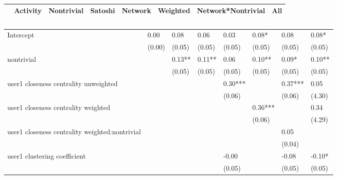 \begin{table}
\caption{}
\begin{center}
\begin{tabular}{lccccccc}
\hline
                                               & Activity & Nontrivial & Satoshi &   Network   & Weighted & Network*Nontrivial &  All    \\
\hline
\hline
\end{tabular}
\begin{tabular}{llllllll}
Intercept                                      & 0.00     & 0.08       & 0.06    & 0.03        & 0.08*    & 0.08               & 0.08*   \\
                                               & (0.00)   & (0.05)     & (0.05)  & (0.05)      & (0.05)   & (0.05)             & (0.05)  \\
nontrivial                                     &          & 0.13**     & 0.11**  & 0.06        & 0.10**   & 0.09*              & 0.10**  \\
                                               &          & (0.05)     & (0.05)  & (0.05)      & (0.05)   & (0.05)             & (0.05)  \\
user1 closeness centrality unweighted          &          &            &         & 0.30***     &          & 0.37***            & 0.05    \\
                                               &          &            &         & (0.06)      &          & (0.06)             & (4.30)  \\
user1 closeness centrality weighted            &          &            &         &             & 0.36***  &                    & 0.34    \\
                                               &          &            &         &             & (0.06)   &                    & (4.29)  \\
user1 closeness centrality weighted:nontrivial &          &            &         &             &          & 0.05               &         \\
                                               &          &            &         &             &          & (0.04)             &         \\
user1 clustering coefficient                   &          &            &         & -0.00       &          & -0.08              & -0.10*  \\
                                               &          &            &         & (0.05)      &          & (0.05)             & (0.05)  \\

\end{tabular}
\end{center}
\end{table}
